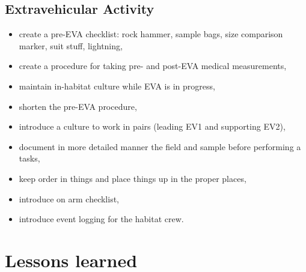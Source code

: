 \documentclass[preprint]{elsarticle}
\begin{document}
\subsection{Extravehicular Activity}
\begin{itemize}
\item create a pre-EVA checklist: rock hammer, sample bags, size comparison marker, suit stuff, lightning,
\item create a procedure for taking pre- and post-EVA medical measurements,
\item maintain in-habitat culture while EVA is in progress,
\item shorten the pre-EVA procedure,
\item introduce a culture to work in pairs (leading EV1 and supporting EV2),
\item document in more detailed manner the field and sample before performing a tasks,
\item keep order in things and place things up in the proper places,
\item introduce on arm checklist,
\item introduce event logging for the habitat crew.
\end{itemize}

\section{Lessons learned}
\end{document}
